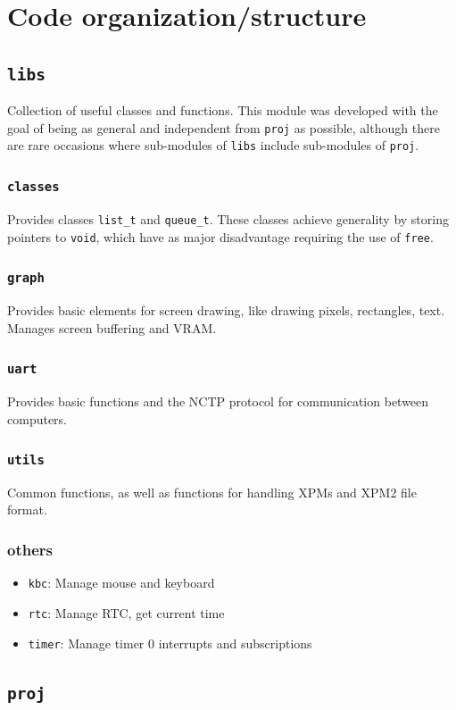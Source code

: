 \documentclass{article}
\theoremstyle{remark}
\begin{document}
\section{Code organization/structure}
\subsection{\texttt{libs}}
Collection of useful classes and functions. This module was developed with the goal of being as general and independent from \texttt{proj} as possible, although there are rare occasions where sub-modules of \texttt{libs} include sub-modules of \texttt{proj}.
\subsubsection{\texttt{classes}}
Provides classes \texttt{list\_t} and \texttt{queue\_t}. These classes achieve generality by storing pointers to \texttt{void}, which have as major disadvantage requiring the use of \texttt{free}. \par
\subsubsection{\texttt{graph}}
Provides basic elements for screen drawing, like drawing pixels, rectangles, text. Manages screen buffering and VRAM.
\subsubsection{\texttt{uart}}
Provides basic functions and the NCTP protocol for communication between computers.
\subsubsection{\texttt{utils}}
Common functions, as well as functions for handling XPMs and XPM2 file format.
\subsubsection{others}
\begin{itemize}
	\item \texttt{kbc}: Manage mouse and keyboard
	\item \texttt{rtc}: Manage RTC, get current time
	\item \texttt{timer}: Manage timer 0 interrupts and subscriptions
\end{itemize}
\subsection{\texttt{proj}}
\end{document}
